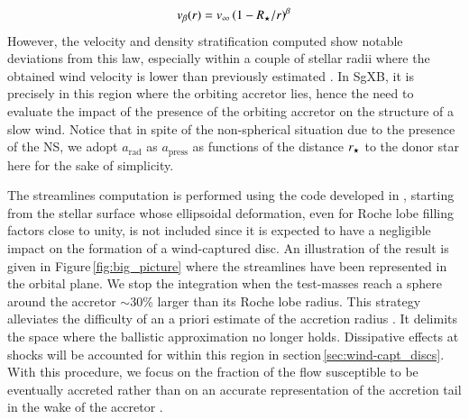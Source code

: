 \documentclass{aa}
\makeatletter
\newcommand{\sgx}{SgXB\xspace}
\newcommand*{\ns}{NS\@\xspace}
\newcommand{\mystar}{{\fontfamily{lmr}\selectfont$\star$}}
\makeatother
\begin{document}
\begin{equation}
v_{\beta}(r)=v_{\infty}\left(1-R_{\text{\mystar}}/r\right)^{\beta}
\end{equation}
However, the velocity and density stratification computed show notable deviations from this law, especially within a couple of stellar radii where the obtained wind velocity is lower than previously estimated \citep[see the radial velocity profiles in Figure 5 of][]{Sander2017}. In \sgx, it is precisely in this region where the orbiting accretor lies, hence the need to evaluate the impact of the presence of the orbiting accretor on the structure of a slow wind. Notice that in spite of the non-spherical situation due to the presence of the \ns, we adopt $a_\text{rad}$ as $a_\text{press}$ as functions of the distance $r_{\text{\mystar}}$ to the donor star here for the sake of simplicity.

The streamlines computation is performed using the code developed in \cite{ElMellah2016a}, starting from the stellar surface whose ellipsoidal deformation, even for Roche lobe filling factors close to unity, is not included since it is expected to have a negligible impact on the formation of a wind-captured disc. An illustration of the result is given in Figure\,\ref{fig:big_picture} where the streamlines have been represented in the orbital plane. We stop the integration when the test-masses reach a sphere around the accretor $\sim$30\% larger than its Roche lobe radius. This strategy alleviates the difficulty of an a priori estimate of the accretion radius \citep[the critical impact parameter below which test-masses are captured in the BHL formalism,][]{Edgar:2004ip}. It delimits the space where the ballistic approximation no longer holds. Dissipative effects at shocks will be accounted for within this region in section\,\ref{sec:wind-capt_discs}. With this procedure, we focus on the fraction of the flow susceptible to be eventually accreted rather than on an accurate representation of the accretion tail in the wake of the accretor \citep[for this component, see rather][]{Manousakis2014}.
\end{document}

